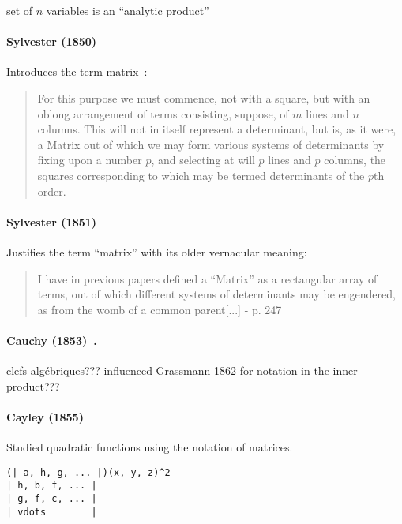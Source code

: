set of $n$ variables is an ``analytic product''



\paragraph{Sylvester (1850)~\cite{Sylvester1850}}

Introduces the term matrix~\cite[p. 150]{Sylvester1850}:

\begin{quote}
For this purpose we must commence, not
with a square, but with an oblong arrangement of terms consisting, suppose,
of $m$ lines and $n$ columns. This will not in itself represent a determinant,
but is, as it were, a Matrix out of which we may form various systems of
determinants by fixing upon a number $p$, and selecting at will $p$ lines and $p$
columns, the squares corresponding to which may be termed determinants
of the $p$th order.
\end{quote}

\paragraph{Sylvester (1851)~\cite{Sylvester1851}}

Justifies the term ``matrix'' with its older vernacular meaning:

\begin{quote}
I have in previous papers defined a ``Matrix'' as a rectangular array of
terms, out of which different systems of determinants may be engendered,
as from the womb of a common parent[...] - p. 247
\end{quote}

\paragraph{Cauchy (1853)~\cite{Cauchy1853}.} clefs algébriques??? influenced Grassmann 1862 for notation in the inner product???


\paragraph{Cayley (1855)~\cite{Cayley1855}}

Studied quadratic functions using the notation of matrices.

\begin{verbatim}
(| a, h, g, ... |)(x, y, z)^2
| h, b, f, ... |
| g, f, c, ... |
| vdots        |
\end{verbatim}

